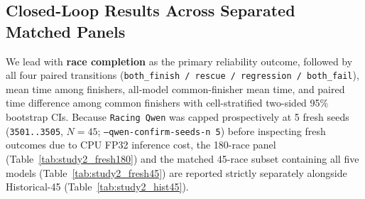 \documentclass[11pt,a4paper]{article}
\begin{document}
\subsection{Closed-Loop Results Across Separated Matched Panels}

We lead with \textbf{race completion} as the primary reliability outcome, followed by all four paired transitions (\texttt{both\_finish / rescue / regression / both\_fail}), mean time among finishers, all-model common-finisher mean time, and paired time difference among common finishers with cell-stratified two-sided 95\% bootstrap CIs. Because \texttt{Racing Qwen} was capped prospectively at 5 fresh seeds (\texttt{3501..3505}, $N=45$; \texttt{--qwen-confirm-seeds-n 5}) before inspecting fresh outcomes due to CPU FP32 inference cost, the 180-race panel (Table~\ref{tab:study2_fresh180}) and the matched 45-race subset containing all five models (Table~\ref{tab:study2_fresh45}) are reported strictly separately alongside Historical-45 (Table~\ref{tab:study2_hist45}).

\begin{table}[t]
\centering
\caption{Study~2 (Panel A): Fresh confirmation closed-loop results ($N=180$, seeds \texttt{3501..3520}, pit-free Stage~B). Paired outcomes report \texttt{both\_finish / rescue / regression / both\_fail}; $\Delta t$ is mean paired time difference among common finishers ($n$) with cell-stratified two-sided 95\% bootstrap CIs. All-model common-finisher subset size is $n=152$.}
\label{tab:study2_fresh180}
\end{table}
\end{document}
